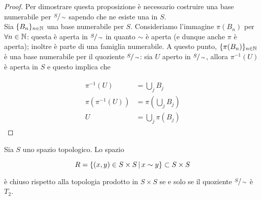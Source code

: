 \begin{proof}\label{solved-es2-4}
	Per dimostrare questa proposizione è necessario costruire una base numerabile per $ \sfrac{S}{\sim} $ sapendo che ne esiste una in $ S $.\\
	Sia $ \{B_{n}\}_{n \in \mathbb{N}} $ una base numerabile per $ S $. Consideriamo l'immagine $ \pi(B_{n}) $ per $ \forall n \in \mathbb{N} $: questa è aperta in $ \sfrac{S}{\sim} $ in quanto $ \sim $ è aperta (e dunque anche $ \pi $ è aperta); inoltre è parte di una famiglia numerabile. A questo punto, $ \{\pi(B_{n})\}_{n \in \mathbb{N}} $ è una base numerabile per il quoziente $ \sfrac{S}{\sim} $: sia $ U $ aperto in $ \sfrac{S}{\sim} $, allora $ \pi^{-1}(U) $ è aperta in $ S $ e questo implica che
	
	\begin{align}
		\begin{split}
			\pi^{-1}(U) &= \bigcup_{j} B_{j}\\
			\pi(\pi^{-1}(U)) &= \pi \left( \bigcup_{j} B_{j} \right)\\
			U &= \bigcup_{j} \pi(B_{j})
		\end{split}
	\end{align}
\end{proof}

\begin{definition}\label{prop-t2}
	Sia $ S $ uno spazio topologico. Lo spazio
	
	\begin{equation}
		R = \left\{ (x,y) \in S \times S \, \middle| \, x \sim y \right\} \subset S \times S
	\end{equation}

	è chiuso rispetto alla topologia prodotto in $ S \times S $ se e solo se il quoziente $ \sfrac{S}{\sim} $ è $ T_{2} $.
\end{definition}

